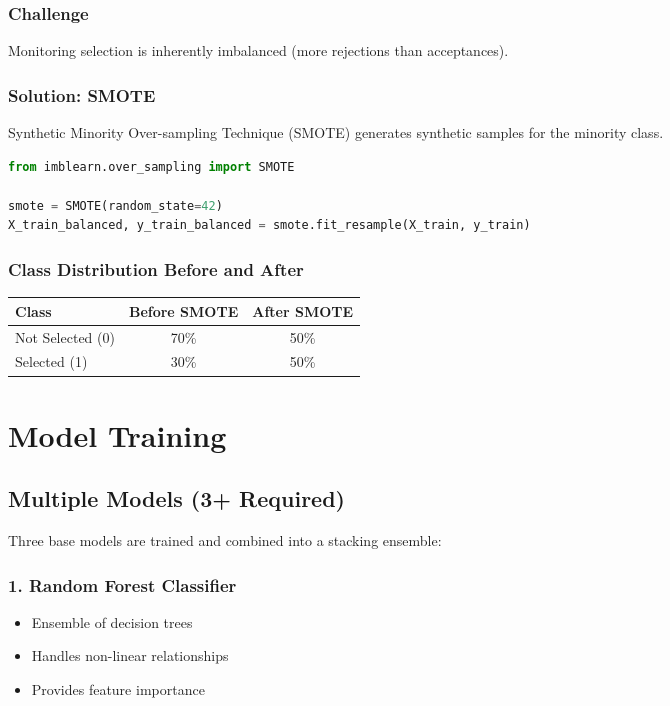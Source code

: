 \documentclass[12pt,a4paper]{report}
\begin{document}
\subsection{Challenge}
Monitoring selection is inherently imbalanced (more rejections than acceptances).

\subsection{Solution: SMOTE}
Synthetic Minority Over-sampling Technique (SMOTE) generates synthetic samples for the minority class.

\begin{lstlisting}[language=Python]
from imblearn.over_sampling import SMOTE

smote = SMOTE(random_state=42)
X_train_balanced, y_train_balanced = smote.fit_resample(X_train, y_train)
\end{lstlisting}

\subsection{Class Distribution Before and After}

\begin{center}
\begin{tabular}{|l|c|c|}
\hline
\textbf{Class} & \textbf{Before SMOTE} & \textbf{After SMOTE} \\
\hline
Not Selected (0) & 70\% & 50\% \\
Selected (1) & 30\% & 50\% \\
\hline
\end{tabular}
\end{center}

\chapter{Model Training}

\section{Multiple Models (3+ Required)}

Three base models are trained and combined into a stacking ensemble:

\subsection{1. Random Forest Classifier}
\begin{itemize}
    \item Ensemble of decision trees
    \item Handles non-linear relationships
    \item Provides feature importance
\end{itemize}
\end{document}

